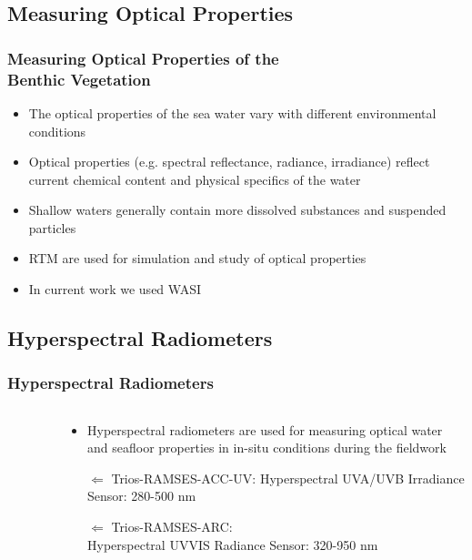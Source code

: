 \documentclass[pdflatex,compress,9pt,
	xcolor={dvipsnames,dvipsnames,svgnames,x11names,table},
	hyperref={colorlinks = true,breaklinks = true, urlcolor = NavyBlue, breaklinks = true}]{beamer}
\begin{document}
\subsection{Measuring Optical Properties}
\begin{frame}\frametitle{Measuring Optical Properties of the \\Benthic Vegetation}
\begin{itemize}
	\item The optical properties of the sea water vary with different environmental conditions
	\item Optical properties (e.g. spectral reflectance, radiance, irradiance) reflect current chemical content and physical specifics of the water
	\item Shallow waters generally contain more dissolved substances and suspended particles
	\item \ac{RTM} are used for simulation and study of optical properties
	\item In current work we used \ac{WASI} 
\end{itemize}
\end{frame}

\subsection{Hyperspectral Radiometers}
\begin{frame}\frametitle{Hyperspectral Radiometers}
\begin{minipage}[0.4\textheight]{\textwidth}
\begin{columns}[T]
\begin{column}{0.5\textwidth}
\begin{figure}[H]
	\centering
			\vspace{1mm}
\end{figure}
\end{column}
\begin{column}{0.5\textwidth}
\vspace{3em}
\begin{itemize}
	\item Hyperspectral radiometers are used for measuring optical water and seafloor properties in in-situ
conditions during the fieldwork
	\item  [$\Longleftarrow$] \ac{Trios-RAMSES}-ACC-UV: Hyperspectral UVA/UVB Irradiance Sensor: 280-500 nm
	\item  [$\Longleftarrow$] \ac{Trios-RAMSES}-ARC: \\Hyperspectral UVVIS Radiance Sensor: 320-950 nm
\end{itemize}
\end{column}
\end{columns}
\end{minipage}
\end{frame}
\end{document}
